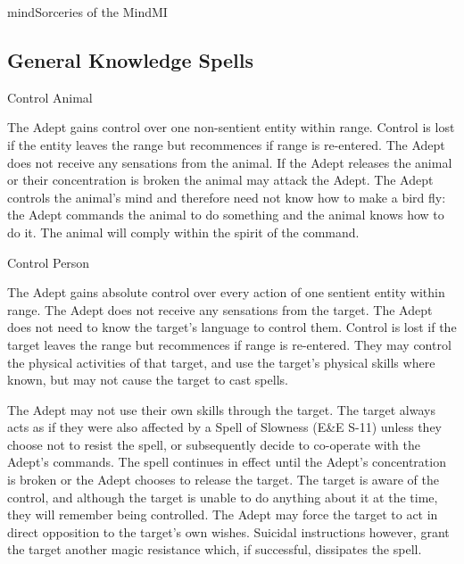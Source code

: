 \begin{college}[1.6]{mind}{Sorceries of the Mind}{MI}
\subsection{General Knowledge Spells}

\begin{spell}[G-1]{Control Animal}

\begin{effects}
The Adept gains control over one non-sentient entity within
range. Control is lost if the entity leaves the range but recommences
if range is re-entered. The Adept does not receive any sensations from
the animal. If the Adept releases the animal or their concentration is
broken the animal may attack the Adept. The Adept controls the
animal's mind and therefore need not know how to make a bird fly: the
Adept commands the animal to do something and the animal knows how to
do it. The animal will comply within the spirit of the command.
\end{effects}
\end{spell}

\begin{spell}[G-2]{Control Person}

\begin{effects}
The Adept gains absolute control over every action of one sentient
entity within range. The Adept does not receive any sensations from
the target. The Adept does not need to know the target's language to
control them. Control is lost if the target leaves the range but
recommences if range is re-entered. They may control the physical
activities of that target, and use the target's physical skills where
known, but may not cause the target to cast spells.

The Adept may not use their own skills through the target. The target
always acts as if they were also affected by a Spell of Slowness (E\&E
S-11) unless they choose not to resist the spell, or subsequently
decide to co-operate with the Adept's commands. The spell continues in
effect until the Adept's concentration is broken or the Adept chooses
to release the target. The target is aware of the control, and
although the target is unable to do anything about it at the time,
they will remember being controlled. The Adept may force the target to
act in direct opposition to the target's own wishes. Suicidal
instructions however, grant the target another magic resistance which,
if successful, dissipates the spell.
\end{effects}
\end{spell}


\end{college}
